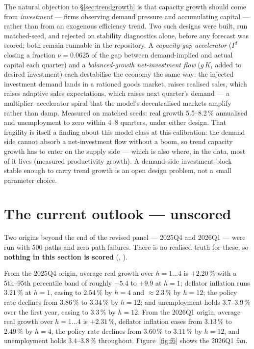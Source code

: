 \documentclass[11pt,a4paper]{article}
\newcommand{\code}[1]{\texttt{\detokenize{#1}}}
\begin{document}
The natural objection to \S\ref{sec:trendgrowth} is that capacity growth should come from
\emph{investment} --- firms observing demand pressure and accumulating capital --- rather than
from an exogenous efficiency trend. Two such designs were built, run matched-seed, and rejected
on stability diagnostics alone, before any forecast was scored; both remain runnable in the
repository. A \emph{capacity-gap accelerator} ($I^d$ closing a fraction $\nu=0.0625$ of the gap
between demand-implied and actual capital each quarter) and a \emph{balanced-growth
net-investment flow} ($g\,K_i$ added to desired investment) each destabilise the economy the
same way: the injected investment demand lands in a rationed goods market, raises realised
sales, which raises adaptive sales expectations, which raises next quarter's demand --- a
multiplier--accelerator spiral that the model's decentralised markets amplify rather than damp.
Measured on matched seeds: real growth 5.5--8.2\,\% annualised and unemployment to zero within
4--8 quarters, under either design. That fragility is itself a finding about this model class at
this calibration: the demand side cannot absorb a net-investment flow without a boom, so trend
capacity growth has to enter on the supply side --- which is also where, in the data, most of it
lives (measured productivity growth). A demand-side investment block stable enough to carry
trend growth is an open design problem, not a small parameter choice.

\FloatBarrier
\section{The current outlook --- unscored}
\label{sec:outlook}

Two origins beyond the end of the revised panel --- 2025Q4 and 2026Q1 --- were run with 500 paths
and zero path failures. There is no realised truth for these, so \textbf{nothing in this section
is scored} (\code{scored = false}, \code{realized_truth_available = false}).

From the 2025Q4 origin, average real growth over $h=1\ldots4$ is $+2.20\,\%$ with a 5th--95th
percentile band of roughly $-5.4$ to $+9.9$ at $h=1$; deflator inflation runs $3.21\,\%$ at
$h=1$, easing to $2.54\,\%$ by $h=4$ and $\approx2.3\,\%$ by $h=12$; the policy rate declines
from $3.86\,\%$ to $3.34\,\%$ by $h=12$; and unemployment holds $3.7$--$3.9\,\%$ over the first
year, easing to $3.3\,\%$ by $h=12$. From the 2026Q1 origin, average real growth over
$h=1\ldots4$ is $+2.31\,\%$, deflator inflation eases from $3.13\,\%$ to $2.49\,\%$ by $h=4$,
the policy rate declines from $3.60\,\%$ to $3.11\,\%$ by $h=12$, and unemployment holds
$3.4$--$3.8\,\%$ throughout. Figure~\ref{fig:f6} shows the 2026Q1 fan.
\end{document}
